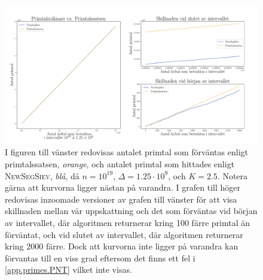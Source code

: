 \begin{figure}[H]
    \centering
    \includegraphics[width = \textwidth]{coen/Images/Primes.pdf}
    \caption{I figuren till vänster redovisas antalet primtal som förväntas enligt primtalssatsen, \textit{orange}, och antalet primtal som hittades enligt \textsc{NewSegSiev}, \textit{blå}, då \(n = 10^{19}\), \(\Delta = 1.25\cdot10^{9}\), och \(K = 2.5\). 
    Notera gärna att kurvorna ligger nästan på varandra. 
    I grafen till höger redovisas inzoomade versioner av grafen till vänster för att visa skillnaden mellan vår uppskattning och det som förväntas vid början av intervallet, där algoritmen returnerar kring 100 färre primtal än förväntat, och vid slutet av intervallet, där algoritmen returnerar kring 2000 färre.
    Dock att kurvorna inte ligger på varandra kan förvantas till en viss grad eftersom det finns ett fel i \ref{app.primes.PNT} vilket inte visas.}
    \label{fig:res.prime}
\end{figure}

